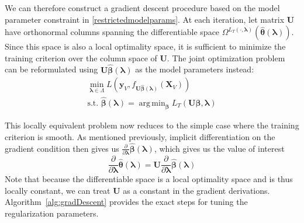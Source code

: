 \documentclass[12pt]{article}
\DeclareMathOperator*{\argmin}{arg\,min}
\begin{document}
We can therefore construct a gradient descent procedure based on the model parameter constraint in \eqref{restrictedmodelparams}. At each iteration, let matrix $\boldsymbol U$ have orthonormal columns spanning the differentiable space $\Omega^{L_T(\cdot, \boldsymbol{\lambda})}(\hat {\boldsymbol \theta}(\boldsymbol{\lambda}))$. Since this space is also a local optimality space, it is sufficient to minimize the training criterion over the column space of $\boldsymbol U$. The joint optimization problem can be reformulated using $\boldsymbol U \hat {\boldsymbol \beta}(\boldsymbol{\lambda})$ as the model parameters instead:
\begin{equation}
\begin{array}{c}
\min_{\boldsymbol \lambda \in \Lambda} L(\boldsymbol y_V, f_{\boldsymbol U \hat{\boldsymbol \beta} (\boldsymbol \lambda) }(\boldsymbol X_V)) \\
\text{s.t. } \hat{\boldsymbol \beta} (\boldsymbol \lambda) =
\argmin_{\boldsymbol \beta}
L_T (\boldsymbol U \boldsymbol \beta, \boldsymbol{\lambda} )
\end{array}
\end{equation}

This locally equivalent problem now reduces to the simple case where the training criterion is smooth. As mentioned previously, implicit differentiation on the gradient condition then gives us $\frac{\partial}{\partial \boldsymbol \lambda}\hat{\boldsymbol \beta}(\boldsymbol \lambda)$, which gives us the value of interest
\begin{equation}
\frac{\partial}{\partial \boldsymbol \lambda}
\hat{\boldsymbol \theta}(\boldsymbol \lambda) =
\boldsymbol U
\frac{\partial}{\partial \boldsymbol \lambda}\hat{\boldsymbol \beta}(\boldsymbol \lambda)
\end{equation}
Note that because the differentiable space is a local optimality space and is thus locally constant, we can treat $\boldsymbol U$ as a constant in the gradient derivations. Algorithm~\ref{alg:gradDescent} provides the exact steps for tuning the regularization parameters.
\end{document}
